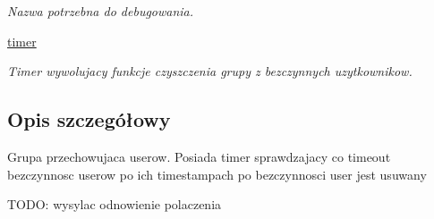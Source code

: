 \begin{DoxyCompactItemize}
\begin{DoxyCompactList}\small\item\em Nazwa potrzebna do debugowania. \item\end{DoxyCompactList}\item 
\hypertarget{class_serv_1_1_group_1_1_group_af32cede000e34bd216170b4969c2e938}{
\hyperlink{class_serv_1_1_group_1_1_group_af32cede000e34bd216170b4969c2e938}{timer}}
\label{class_serv_1_1_group_1_1_group_af32cede000e34bd216170b4969c2e938}

\begin{DoxyCompactList}\small\item\em Timer wywolujacy funkcje czyszczenia grupy z bezczynnych uzytkownikow. \item\end{DoxyCompactList}\end{DoxyCompactItemize}


\subsection{Opis szczegółowy}
\begin{DoxyVerb}Grupa przechowujaca userow.
Posiada timer sprawdzajacy co timeout bezczynnosc userow po ich timestampach
po bezczynnosci user jest usuwany

TODO: wysylac odnowienie polaczenia    
\end{DoxyVerb}
 


